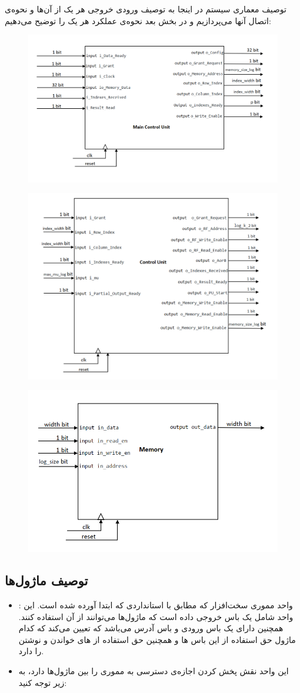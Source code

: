 \documentclass[]{article}
\begin{document}
\begin{section-container}{توصیف معماری سیستم}
	در اینجا به توصیف ورودی‌ خروجی‌ هر یک از آن‌ها و نحوه‌ی اتصال ‌آنها می‌پردازیم و در بخش بعد نحوه‌ی عملکرد هر یک را توضیح می‌دهیم:
	
\begin{figure}[h]
	\centering
	\includegraphics[width=0.5\linewidth]{source/main_cu.png}
	\caption{}
\end{figure}

\begin{figure}[h]
	\centering
	\includegraphics[width=0.5\linewidth]{source/ControlUnit.png}
	\caption{}
\end{figure}

\begin{figure}[h]
	\centering
	\includegraphics[width=0.5\linewidth]{source/Memory.png}
	\caption{}
\end{figure}
	
\subsection{توصیف ماژول‌ها}

\begin{itemize}
	\item 
	:
	واحد مموری سخت‌افزار که مطابق با استانداردی که ابتدا آورده شده است. این واحد شامل یک باس خروجی داده است که ماژول‌ها می‌توانند از آن استفاده کنند. همچنین دارای یک باس ورودی و باس آدرس می‌باشد که  تعیین می‌کند که کدام ماژول حق استفاده از این باس ‌ها و همچنین حق استفاده از های‌ خواندن و نوشتن را دارد.
	\item 
	این واحد نقش پخش کردن اجازه‌ی دسترسی به مموری را بین ماژول‌ها دارد، به  زیر توجه کنید:
	

\end{itemize}
\end{section-container}
\end{document}
